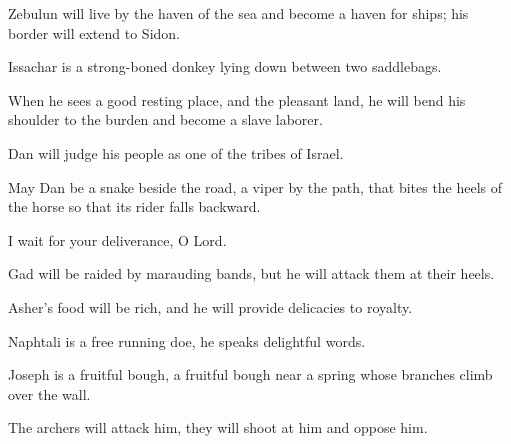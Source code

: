 \begin{scripture}
 Zebulun will live by the haven of the sea and become a haven for ships; his border will extend to Sidon.
\everypar{}

 Issachar is a strong-boned donkey lying down between two saddlebags.
\everypar{}

 When he sees a good resting place, and the pleasant land, he will bend his shoulder to the burden and become a slave laborer.
\everypar{}

 Dan will judge his people as one of the tribes of Israel.
\everypar{}

 May Dan be a snake beside the road, a viper by the path, that bites the heels of the horse so that its rider falls backward.
\everypar{}

 I wait for your deliverance, O Lord.
\everypar{}

 Gad will be raided by marauding bands, but he will attack them at their heels.
\everypar{}

 Asher's food will be rich, and he will provide delicacies to royalty.
\everypar{}

 Naphtali is a free running doe, he speaks delightful words.
\everypar{}

 Joseph is a fruitful bough, a fruitful bough near a spring whose branches climb over the wall.
\everypar{}

 The archers will attack him, they will shoot at him and oppose him.
\everypar{}


\end{scripture}
